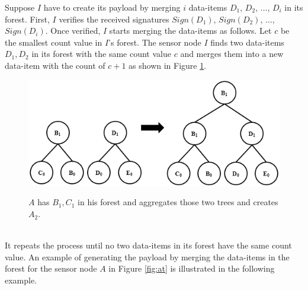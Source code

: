 	Suppose $I$ have to create its payload by merging $i$ data-items $D_{1}$, $D_{2}$, $\dotsc$, $D_{i}$ in its forest.
	First, $I$ verifies the received signatures $Sign(D_{1})$, $Sign(D_{2})$, $\dotsc$, $Sign(D_{i})$.
	Once verified, $I$ starts merging the data-items as follows.
	Let $c$ be the smallest count value in $I$'s forest.
	The sensor node $I$ finds two data-items $D_{1},D_{2}$ in its forest with the same count value $c$ and merges them into a new data-item with the count of $c+1$ as shown in Figure \ref{fig:increase-height}.
	\begin{figure}[h!]
		\includegraphics[width=6in]{images/increase-height.png}\\
		\caption{$A$ has $B_{1}, C_{1}$ in his forest and aggregates those two trees and creates $A_{2}$.}
		\label{fig:increase-height}
	\end{figure}\\
	It repeats the process until no two data-items in its forest have the same count value.
	An example of generating the payload by merging the data-items in the forest for the sensor node $A$ in Figure \ref{fig:at} is illustrated in the following example.
